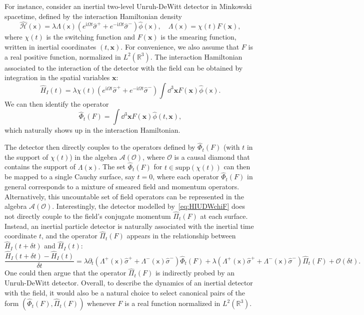 \documentclass[letterpaper,12pt,titlepage,oneside,final]{book}
\newcommand{\mf}{\mathsf}%
\newcommand{\ii}{\mathrm{i}}
\newcommand{\s}{\hat{\sigma}}
\begin{document}
For instance, consider an inertial two-level Unruh-DeWitt detector in Minkowski spacetime, defined by the interaction Hamiltonian density
\begin{equation}\label{eq:HIUDWchiF}
    \hat{\mathcal{H}}(\mf x) = \lambda \Lambda(\mf x) (e^{\ii \Omega t}\hat{\sigma}^+ + e^{- \ii \Omega t}\s^-)\hat{\phi}(\mf x), \quad \Lambda(\mf x) = \chi(t)F(\bm x),
\end{equation}
where $\chi(t)$ is the switching function and $F(\bm x)$ is the smearing function, written in inertial coordinates $(t,\bm x)$. For convenience, we also assume that $F$ is a real positive function, normalized in $L^2(\mathbb{R}^3)$. The interaction Hamiltonian associated to the interaction of the detector with the field can be obtained by integration in the spatial variables $\bm x$:
\begin{equation}
    \hat{H}_I(t) = \lambda \chi(t) (e^{\ii \Omega t}\hat{\sigma}^+ + e^{- \ii \Omega t}\s^-) \int \dd^3 \bm x F(\bm x) \hat{\phi}(\mf x).
\end{equation}
We can then identify the operator
\begin{equation}
    \hat{\Phi}_t(F) = \int \dd^3 \bm x F(\bm x)\hat{\phi}(t, \bm x),
\end{equation}
which naturally shows up in the interaction Hamiltonian. 

The detector then directly couples to the operators defined by $\hat{\Phi}_t(F)$ (with $t$ in the support of $\chi(t)$) in the algebra $\mathcal{A}(\mathcal{O})$, where $\mathcal{O}$ is a causal diamond that contains the support of $\Lambda(\mf x)$. The set $\hat{\Phi}_t(F)$ for $t\in \text{supp}(\chi(t))$ can then be mapped to a single Cauchy surface, say $t=0$, where each operator $\hat{\Phi}_t(F)$ in general corresponds to a mixture of smeared field and momentum operators. Alternatively, this uncountable set of field operators can be represented in the algebra $\mathcal{A}(\mathcal{O})$. Interestingly, the detector modelled by~\eqref{eq:HIUDWchiF} does not directly couple to the field's conjugate momentum $\hat{\Pi}_t(F)$ at each surface. Instead, an inertial particle detector is naturally associated with the inertial time coordinate $t$, and the operator $\hat{\Pi}_t(F)$ appears in the relationship between $\hat{H}_I(t+\delta t)$ and $\hat{H}_I(t)$:
\begin{equation}
    \frac{\hat{H}_I(t+\delta t) - \hat{H}_I(t)}{\delta t} = \lambda \partial_t(\Lambda^+(\mf x) \hat{\sigma}^+ + \Lambda^-(\mf x) \hat{\sigma}^-)\hat{\Phi}_t(F) + \lambda(\Lambda^+(\mf x) \hat{\sigma}^+ +\Lambda^-(\mf x) \hat{\sigma}^-)\hat{\Pi}_t(F) + \mathcal{O}(\delta t).
\end{equation}
One could then argue that the operator $\hat{\Pi}_t(F)$ is indirectly probed by an Unruh-DeWitt detector. Overall, to describe the dynamics of an inertial detector with the field, it would also be a natural choice to select canonical pairs of the form $(\hat{\Phi}_t(F),\hat{\Pi}_t(F))$ whenever $F$ is a real function normalized in $L^2(\mathbb{R}^3)$.
\end{document}
